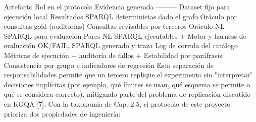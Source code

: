 {}\markdownRendererPipe{} Artefacto \markdownRendererPipe{} Rol en el protocolo \markdownRendererPipe{} Evidencia generada \markdownRendererPipe{} \markdownRendererPipe{}---\markdownRendererPipe{}---\markdownRendererPipe{}---\markdownRendererPipe{} \markdownRendererPipe{}  \markdownRendererPipe{} Dataset fijo para ejecución local \markdownRendererPipe{} Resultados SPARQL deterministas dado el grafo \markdownRendererPipe{} \markdownRendererPipe{}  \markdownRendererPipe{} Oráculo por consultas gold (auditorías) \markdownRendererPipe{} Consultas revisables por terceros \markdownRendererPipe{} \markdownRendererPipe{}  \markdownRendererPipe{} Oráculo NL-SPARQL para evaluación \markdownRendererPipe{} Pares NL-SPARQL ejecutables \markdownRendererPipe{} \markdownRendererPipe{}  +  \markdownRendererPipe{} Motor y harness de evaluación \markdownRendererPipe{} OK/FAIL, SPARQL generado y traza \markdownRendererPipe{} \markdownRendererPipe{}  \markdownRendererPipe{} Log de corrida del catálogo \markdownRendererPipe{} Métricas de ejecución + auditoría de fallos \markdownRendererPipe{} \markdownRendererPipe{}  +  \markdownRendererPipe{} Estabilidad por paráfrasis \markdownRendererPipe{} Consistencia por grupo e indicadores de regresión \markdownRendererPipe{}\markdownRendererInterblockSeparator
{}Esta separación de responsabilidades permite que un tercero replique el experimento sin "interpretar" decisiones implícitas (por ejemplo, qué límites se usan, qué esquema se permite o qué se considera correcto), mitigando parte del problema de replicación discutido en KGQA [7].\markdownRendererInterblockSeparator
{}\markdownRendererInterblockSeparator
{}Con la taxonomía de Cap. 2.5, el protocolo de este proyecto prioriza dos propiedades de ingeniería:\markdownRendererInterblockSeparator
{}\markdownRendererUlBeginTight
